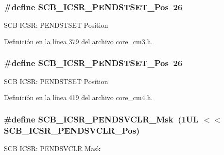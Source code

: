 \subsubsection[{\texorpdfstring{S\+C\+B\+\_\+\+I\+C\+S\+R\+\_\+\+P\+E\+N\+D\+S\+T\+S\+E\+T\+\_\+\+Pos}{SCB_ICSR_PENDSTSET_Pos}}]{\setlength{\rightskip}{0pt plus 5cm}\#define S\+C\+B\+\_\+\+I\+C\+S\+R\+\_\+\+P\+E\+N\+D\+S\+T\+S\+E\+T\+\_\+\+Pos~26}\hypertarget{group___c_m_s_i_s___s_c_b_ga9dbb3358c6167c9c3f85661b90fb2794}{}\label{group___c_m_s_i_s___s_c_b_ga9dbb3358c6167c9c3f85661b90fb2794}
S\+CB I\+C\+SR\+: P\+E\+N\+D\+S\+T\+S\+ET Position 

Definición en la línea 379 del archivo core\+\_\+cm3.\+h.

\subsubsection[{\texorpdfstring{S\+C\+B\+\_\+\+I\+C\+S\+R\+\_\+\+P\+E\+N\+D\+S\+T\+S\+E\+T\+\_\+\+Pos}{SCB_ICSR_PENDSTSET_Pos}}]{\setlength{\rightskip}{0pt plus 5cm}\#define S\+C\+B\+\_\+\+I\+C\+S\+R\+\_\+\+P\+E\+N\+D\+S\+T\+S\+E\+T\+\_\+\+Pos~26}\hypertarget{group___c_m_s_i_s___s_c_b_ga9dbb3358c6167c9c3f85661b90fb2794}{}\label{group___c_m_s_i_s___s_c_b_ga9dbb3358c6167c9c3f85661b90fb2794}
S\+CB I\+C\+SR\+: P\+E\+N\+D\+S\+T\+S\+ET Position 

Definición en la línea 419 del archivo core\+\_\+cm4.\+h.

\subsubsection[{\texorpdfstring{S\+C\+B\+\_\+\+I\+C\+S\+R\+\_\+\+P\+E\+N\+D\+S\+V\+C\+L\+R\+\_\+\+Msk}{SCB_ICSR_PENDSVCLR_Msk}}]{\setlength{\rightskip}{0pt plus 5cm}\#define S\+C\+B\+\_\+\+I\+C\+S\+R\+\_\+\+P\+E\+N\+D\+S\+V\+C\+L\+R\+\_\+\+Msk~(1\+U\+L $<$$<$ S\+C\+B\+\_\+\+I\+C\+S\+R\+\_\+\+P\+E\+N\+D\+S\+V\+C\+L\+R\+\_\+\+Pos)}\hypertarget{group___c_m_s_i_s___s_c_b_ga4a901ace381d3c1c74ac82b22fae2e1e}{}\label{group___c_m_s_i_s___s_c_b_ga4a901ace381d3c1c74ac82b22fae2e1e}
S\+CB I\+C\+SR\+: P\+E\+N\+D\+S\+V\+C\+LR Mask 

